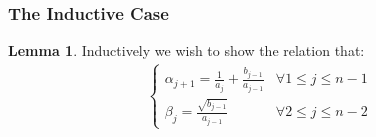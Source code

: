 \documentclass[]{article}
\theoremstyle{definition}
\newtheorem{lemma}{Lemma}[subsection]    %
\begin{document}
        \subsubsection{The Inductive Case}
            \begin{lemma}
                Inductively we wish to show the relation that: 
                \begin{align}
                    \begin{cases}
                        \alpha_{j + 1} = \frac{1}{a_j} + \frac{b_{j - 1}}{a_{j - 1}}
                        & \forall 1 \le j \le n - 1
                        \\
                        \beta_{j} = \frac{\sqrt{b_{j - 1}}}{a_{j - 1}}
                        & \forall 2 \le j \le n - 2 
                    \end{cases}
                \end{align}
            \end{lemma}
\end{document}

